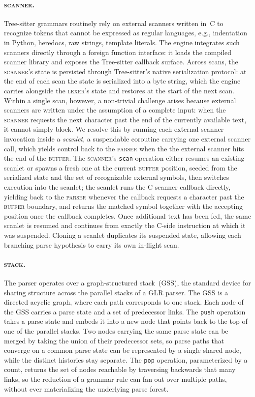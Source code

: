 \documentclass[11pt]{article}
\theoremstyle{plain}
\theoremstyle{definition}
\begin{document}
\paragraph{\textsc{scanner}.} Tree-sitter grammars routinely rely on external
scanners written in~C to recognize tokens that cannot be expressed as regular
languages, e.g., indentation in Python, heredocs, raw strings, template
literals. The engine integrates such scanners directly through a foreign
function interface: it loads the compiled scanner library and exposes the
Tree-sitter callback surface. Across scans, the \textsc{scanner}'s state is
persisted through Tree-sitter's native serialization protocol: at the end of
each scan the state is serialized into a byte string, which the engine carries
alongside the \textsc{lexer}'s state and restores at the start of the next scan.
Within a single scan, however, a non-trivial challenge arises because external
scanners are written under the assumption of a complete input: when the
\textsc{scanner} requests the next character past the end of the currently
available text, it cannot simply block. We resolve this by running each external
scanner invocation inside a \emph{scanlet}, a suspendable coroutine carrying one
external scanner call, which yields control back to the \textsc{parser} when the
the external scanner hits the end of the \textsc{buffer}. The \textsc{scanner}'s
\texttt{scan} operation either resumes an existing scanlet or spawns a fresh one
at the current \textsc{buffer} position, seeded from the serialized state and
the set of recognizable external symbols, then switches execution into the
scanlet; the scanlet runs the C scanner callback directly, yielding back to the
\textsc{parser} whenever the callback requests a character past the
\textsc{buffer} boundary, and returns the matched symbol together with the
accepting position once the callback completes. Once additional text has been
fed, the same scanlet is resumed and continues from exactly the C-side
instruction at which it was suspended. Cloning a scanlet duplicates its
suspended state, allowing each branching parse hypothesis to carry its own
in-flight scan.

\paragraph{\textsc{stack}.} The parser operates over a graph-structured
stack~(GSS), the standard device for sharing structure across the parallel
stacks of a GLR parser. The GSS is a directed acyclic graph, where each path
corresponds to one stack. Each node of the GSS carries a parse state and a set
of predecessor links. The \texttt{push} operation takes a parse state and embeds
it into a new node that points back to the top of one of the parallel stacks.
Two nodes carrying the same parse state can be merged by taking the union of
their predecessor sets, so parse paths that converge on a common parse state can
be represented by a single shared node, while the distinct histories stay
separate. The \texttt{pop} operation, parameterized by a count, returns the set
of nodes reachable by traversing backwards that many links, so the reduction of
a grammar rule can fan out over multiple paths, without ever materializing the
underlying parse forest.
\end{document}

